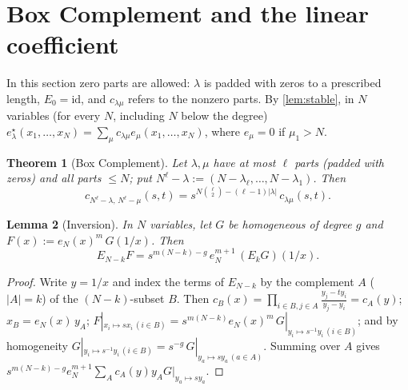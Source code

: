\documentclass[11pt]{amsart}
\newtheorem{theorem}{Theorem}[section]
\newtheorem{lemma}[theorem]{Lemma}
\theoremstyle{definition}
\theoremstyle{remark}
\numberwithin{equation}{section}
\begin{document}
\section{Box Complement and the linear coefficient}\label{sec:box}
In this section zero parts are allowed: $\lambda$ is padded with zeros to a prescribed length, $E_0=\mathrm{id}$, and $c_{\lambda\mu}$ refers to the nonzero parts. By \cref{lem:stable}, in $N$ variables (for every $N$, including $N$ below the degree) $e^\star_\lambda(x_1,\dots,x_N)=\sum_\mu c_{\lambda\mu}e_\mu(x_1,\dots,x_N)$, where $e_\mu=0$ if $\mu_1>N$.

\begin{theorem}[Box Complement]\label{thm:box}
Let $\lambda,\mu$ have at most $\ell$ parts (padded with zeros) and all parts $\le N$; put $N^\ell-\lambda:=(N-\lambda_\ell,\dots,N-\lambda_1)$. Then
\[ c_{N^\ell-\lambda,\,N^\ell-\mu}(s,t)=s^{N\binom{\ell}{2}-(\ell-1)|\lambda|}\,c_{\lambda\mu}(s,t). \]
\end{theorem}
\begin{lemma}[Inversion]\label{lem:inversion}
In $N$ variables, let $G$ be homogeneous of degree $g$ and $F(x):=e_N(x)^m\,G(1/x)$. Then
\[ E_{N-k}F=s^{m(N-k)-g}\,e_N^{m+1}\,(E_kG)(1/x). \]
\end{lemma}
\begin{proof}
Write $y=1/x$ and index the terms of $E_{N-k}$ by the complement $A$ ($|A|=k$) of the $(N-k)$-subset $B$. Then $c_B(x)=\prod_{i\in B,j\in A}\frac{y_j-ty_i}{y_j-y_i}=c_A(y)$; $x_B=e_N(x)\,y_A$; $F|_{x_i\mapsto sx_i\,(i\in B)}=s^{m(N-k)}e_N(x)^m\,G|_{y_i\mapsto s^{-1}y_i\,(i\in B)}$; and by homogeneity $G|_{y_i\mapsto s^{-1}y_i\,(i\in B)}=s^{-g}\,G|_{y_a\mapsto sy_a\,(a\in A)}$. Summing over $A$ gives $s^{m(N-k)-g}e_N^{m+1}\sum_Ac_A(y)y_AG|_{y_a\mapsto sy_a}$.
\end{proof}
\end{document}
